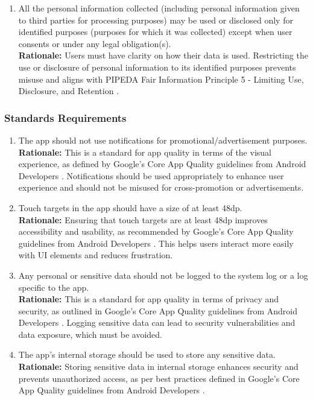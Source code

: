 \documentclass[]{article}
\begin{document}
\begin{enumerate}[{LR-COMP}1. ]
    \item All the personal information collected (including personal information given to third parties for processing purposes) may be used or disclosed only for identified purposes (purposes for which it was collected) except when user consents or under any legal obligation(s).
    \\ \textbf{Rationale:} Users must have clarity on how their data is used. Restricting the use or disclosure of personal information to its identified purposes prevents misuse and aligns with PIPEDA Fair Information Principle 5 - Limiting Use, Disclosure, and Retention \cite{PIPEDA5}.  
\end{enumerate}

\subsubsection{Standards Requirements}
\label{ssub:standards_requirements}
\begin{enumerate}[{LR-STD}1. ]
    \item The app should not use notifications for promotional/advertisement purposes.
    \\ \textbf{Rationale:} This is a standard for app quality in terms of the visual experience, as defined by Google's Core App Quality guidelines from Android Developers \cite{GoogleCoreAppQuality}. Notifications should be used appropriately to enhance user experience and should not be misused for cross-promotion or advertisements.

    \item Touch targets in the app should have a size of at least 48dp.
    \\ \textbf{Rationale:} Ensuring that touch targets are at least 48dp improves accessibility and usability, as recommended by Google's Core App Quality guidelines from Android Developers \cite{GoogleCoreAppQuality}. This helps users interact more easily with UI elements and reduces frustration.

    \item Any personal or sensitive data should not be logged to the system log or a log specific to the app.
    \\ \textbf{Rationale:} This is a standard for app quality in terms of privacy and security, as outlined in Google's Core App Quality guidelines from Android Developers \cite{GoogleCoreAppQuality}. Logging sensitive data can lead to security vulnerabilities and data exposure, which must be avoided.

    \item The app’s internal storage should be used to store any sensitive data.
    \\ \textbf{Rationale:} Storing sensitive data in internal storage enhances security and prevents unauthorized access, as per best practices defined in Google's Core App Quality guidelines from Android Developers \cite{GoogleCoreAppQuality}.
\end{enumerate}
\end{document}
